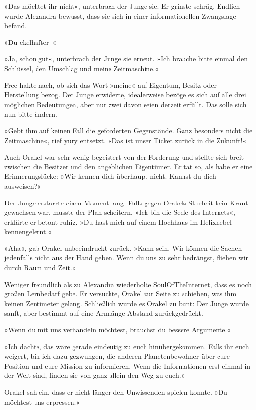 »Das möchtet ihr nicht«, unterbrach der Junge sie. Er grinste schräg. Endlich wurde Alexandra bewusst, dass sie sich in einer informationellen Zwangslage befand.

»Du ekelhafter–«

»Ja, schon gut«, unterbrach der Junge sie erneut. »Ich brauche bitte einmal den Schlüssel, den Umschlag und meine Zeitmaschine.«

Free hakte nach, ob sich das Wort »meine« auf Eigentum, Besitz oder Herstellung bezog. Der Junge erwiderte, idealerweise bezöge es sich auf alle drei möglichen Bedeutungen, aber nur zwei davon seien derzeit erfüllt. Das solle sich nun bitte ändern.

»Gebt ihm auf keinen Fall die geforderten Gegenstände. Ganz besonders nicht die Zeitmaschine«, rief yury entsetzt. »Das ist unser Ticket zurück in die Zukunft!«

Auch Orakel war sehr wenig begeistert von der Forderung und stellte sich breit zwischen die Besitzer und den angeblichen Eigentümer. Er tat so, als habe er eine Erinnerungslücke: »Wir kennen dich überhaupt nicht. Kannst du dich ausweisen?«

Der Junge erstarrte einen Moment lang. Falls gegen Orakels Sturheit kein Kraut gewachsen war, musste der Plan scheitern. »Ich bin die Seele des Internets«, erklärte er betont ruhig. »Du hast mich auf einem Hochhaus im Helixnebel kennengelernt.«

»Aha«, gab Orakel unbeeindruckt zurück. »Kann sein. Wir können die Sachen jedenfalls nicht aus der Hand geben. Wenn du uns zu sehr bedrängst, fliehen wir durch Raum und Zeit.«

Weniger freundlich als zu Alexandra wiederholte SoulOfTheInternet, dass es noch großen Lernbedarf gebe. Er versuchte, Orakel zur Seite zu schieben, was ihm keinen Zentimeter gelang. Schließlich wurde es Orakel zu bunt: Der Junge wurde sanft, aber bestimmt auf eine Armlänge Abstand zurückgedrückt.

»Wenn du mit uns verhandeln möchtest, brauchst du bessere Argumente.«

»Ich dachte, das wäre gerade eindeutig zu euch hinübergekommen. Falls ihr euch weigert, bin ich dazu gezwungen, die anderen Planetenbewohner über eure Position und eure Mission zu informieren. Wenn die Informationen erst einmal in der Welt sind, finden sie von ganz allein den Weg zu euch.«

Orakel sah ein, dass er nicht länger den Unwissenden spielen konnte. »Du möchtest uns erpressen.«

